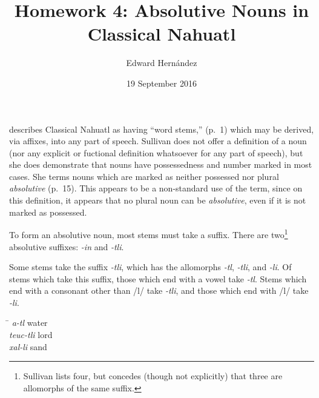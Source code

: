 \documentclass[doc,12pt,natbib]{apa6}
\begin{document}
\title{Homework 4: Absolutive Nouns in Classical Nahuatl}
\author{Edward Hern\'{a}ndez}
\date{19 September 2016}
\maketitle




\citet{Sullivan88} describes Classical Nahuatl as having ``word stems,'' (p.~1)
which may be derived, via affixes, into any part of speech. Sullivan does not
offer a definition of a noun (nor any explicit or fuctional definition
whatsoever for any part of speech), but she does demonstrate that nouns have
possessedness and number marked in most cases. She terms nouns which are marked
as neither possessed nor plural \emph{absolutive} (p.~15). This appears to be a
non-standard use of the term, since on this definition, it appears that no
plural noun can be \emph{absolutive}, even if it is not marked as possessed.

To form an absolutive noun, most stems must take a suffix. There are
two\footnote{Sullivan lists four, but concedes (though not explicitly) that
	three are allomorphs of the same suffix.} absolutive suffixes: \textit{-in}
and \textit{-tli}.

Some stems take the suffix \textit{-tli}, which has the allomorphs
\textit{-tl}, \textit{-tli}, and \textit{-li}.  Of stems which take this
suffix, those which end with a vowel take \textit{-tl}. Stems which end with a
consonant other than /l/ take \textit{-tli}, and those which end with /l/ take
\textit{-li}.
\begin{exe}
	\ex
	\begin{tabbing}
		\hspace*{2cm}\= \kill
		\textit{a-tl} \> water \\
		\textit{teuc-tli} \> lord \\
		\textit{xal-li} \> sand
	\end{tabbing}
\end{exe}
\end{document}
